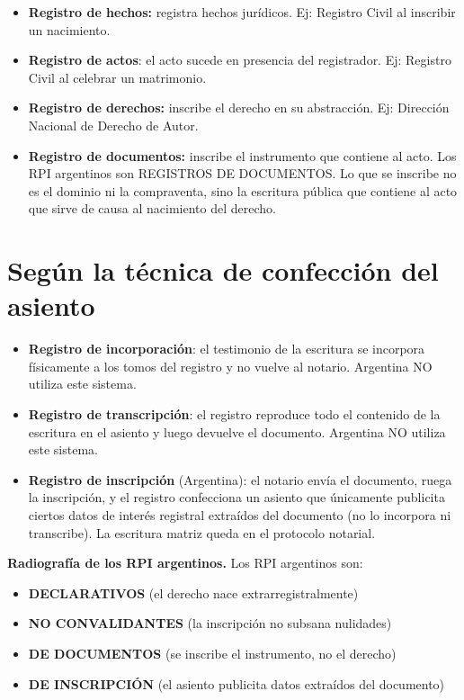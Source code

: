 \documentclass[12pt,oneside]{book}
\begin{document}
\begin{itemize}
    \item \textbf{Registro de hechos:} registra hechos jurídicos. Ej: Registro Civil al inscribir un nacimiento.
    \item \textbf{Registro de actos}: el acto sucede en presencia del registrador. Ej: Registro Civil al celebrar un matrimonio.
    \item \textbf{Registro de derechos:} inscribe el derecho en su abstracción. Ej: Dirección Nacional de Derecho de Autor.
    \item \textbf{Registro de documentos:} inscribe el instrumento que contiene al acto. Los RPI argentinos son REGISTROS DE DOCUMENTOS. Lo que se inscribe no es el dominio ni la compraventa, sino la escritura pública que contiene al acto que sirve de causa al nacimiento del derecho.
\end{itemize}

\section{Según la técnica de confección del asiento}
\label{sec:tecnica-asiento}

\begin{itemize}
    \item \textbf{Registro de incorporación}: el testimonio de la escritura se incorpora físicamente a los tomos del registro y no vuelve al notario. Argentina NO utiliza este sistema.
    \item \textbf{Registro de transcripción}: el registro reproduce todo el contenido de la escritura en el asiento y luego devuelve el documento. Argentina NO utiliza este sistema.
    \item \textbf{Registro de inscripción} (Argentina): el notario envía el documento, ruega la inscripción, y el registro confecciona un asiento que únicamente publicita ciertos datos de interés registral extraídos del documento (no lo incorpora ni transcribe). La escritura matriz queda en el protocolo notarial.
\end{itemize}

\begin{important}
\textbf{Radiografía de los RPI argentinos.} Los RPI argentinos son:
\begin{itemize}
    \item \textbf{DECLARATIVOS} (el derecho nace extrarregistralmente)
    \item \textbf{NO CONVALIDANTES} (la inscripción no subsana nulidades)
    \item \textbf{DE DOCUMENTOS} (se inscribe el instrumento, no el derecho)
    \item \textbf{DE INSCRIPCIÓN} (el asiento publicita datos extraídos del documento)
\end{itemize}
\end{important}
\end{document}
